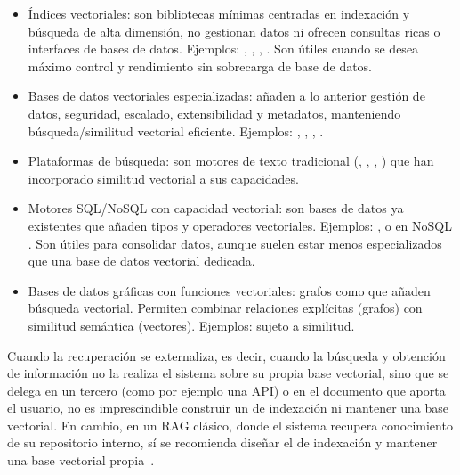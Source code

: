 \begin{itemize}
	\begin{itemize}
		\item Índices vectoriales: son bibliotecas mínimas centradas en indexación y búsqueda de alta dimensión, no gestionan datos ni ofrecen consultas ricas o interfaces de bases de datos. Ejemplos: , , , . Son útiles cuando se desea máximo control y rendimiento sin sobrecarga de base de datos.
		\item Bases de datos vectoriales especializadas: añaden a lo anterior gestión de datos, seguridad, escalado, extensibilidad y metadatos, manteniendo búsqueda/similitud vectorial eficiente. Ejemplos: , , , .
		\item Plataformas de búsqueda: son motores de texto tradicional (, , , ) que han incorporado similitud vectorial a sus capacidades.
		\item Motores SQL/NoSQL con capacidad vectorial: son bases de datos ya existentes que añaden tipos y operadores vectoriales. Ejemplos: ,  o en NoSQL . Son útiles para consolidar datos, aunque suelen estar menos especializados que una base de datos vectorial dedicada.
		\item Bases de datos gráficas con funciones vectoriales: grafos como  que añaden búsqueda vectorial. Permiten combinar relaciones explícitas (grafos) con similitud semántica (vectores). Ejemplos:  sujeto a similitud.
	\end{itemize}
\end{itemize} 

Cuando la recuperación se externaliza, es decir, cuando la búsqueda y obtención de información no la realiza el sistema sobre su propia base vectorial, sino que se delega en un tercero (como por ejemplo una API) o en el documento que aporta el usuario, no es imprescindible construir un  de indexación ni mantener una base vectorial. En cambio, en un RAG clásico, donde el sistema recupera conocimiento de su repositorio interno, sí se recomienda diseñar el  de indexación y mantener una base vectorial propia~\cite{book:RAG_SimpleGuide}.

